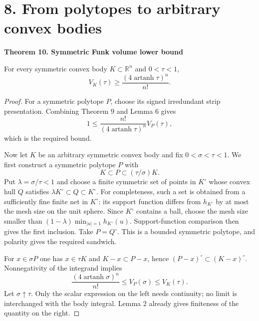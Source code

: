 \documentclass[11pt,a4paper]{article}
\newenvironment{statement}[1]{\begin{tcolorbox}[proofbox]\textbf{#1}\par\smallskip}{\end{tcolorbox}}
\newcommand{\R}{\mathbb R}
\newcommand{\artanh}{\operatorname{artanh}}
\newcommand{\sect}[1]{\section*{#1}}
\begin{document}
\newpage
\sect{8. From polytopes to arbitrary convex bodies}
\begin{statement}{Theorem 10. Symmetric Funk volume lower bound}
For every symmetric convex body $K\subset\R^n$ and $0<\tau<1$,
\[
 V_K(\tau)\geq\frac{(4\artanh\tau)^n}{n!}.
\]
\end{statement}
\begin{proof}
For a symmetric polytope $P$, choose its signed irredundant strip
presentation. Combining Theorem 9 and Lemma 6 gives
\[
 1\leq\frac{n!}{(4\artanh\tau)^n}V_P(\tau),
\]
which is the required bound.

Now let $K$ be an arbitrary symmetric convex body and fix
$0<\sigma<\tau<1$. We first construct a symmetric polytope $P$ with
\[
 K\subset P\subset(\tau/\sigma)K.
\]
Put $\lambda=\sigma/\tau<1$ and choose a finite symmetric set of
points in $K^\circ$ whose convex hull $Q$ satisfies
$\lambda K^\circ\subset Q\subset K^\circ$.
For completeness, such a set is obtained from a sufficiently fine finite
net in $K^\circ$: its support function differs from $h_{K^\circ}$ by
at most the mesh size on the unit sphere. Since $K^\circ$ contains a
ball, choose the mesh size smaller than
$(1-\lambda)\min_{|u|=1}h_{K^\circ}(u)$.
Support-function comparison then gives the first inclusion. Take
$P=Q^\circ$. This is a bounded symmetric polytope, and polarity gives
the required sandwich.

For $x\in\sigma P$ one has $x\in\tau K$ and
$K-x\subset P-x$, hence $(P-x)^\circ\subset(K-x)^\circ$. Nonnegativity
of the integrand implies
\[
 \frac{(4\artanh\sigma)^n}{n!}
 \leq V_P(\sigma)\leq V_K(\tau).
\]
Let $\sigma\uparrow\tau$. Only the scalar expression on the left needs
continuity; no limit is interchanged with the body integral. Lemma 2
already gives finiteness of the quantity on the right.
\end{proof}
\end{document}
